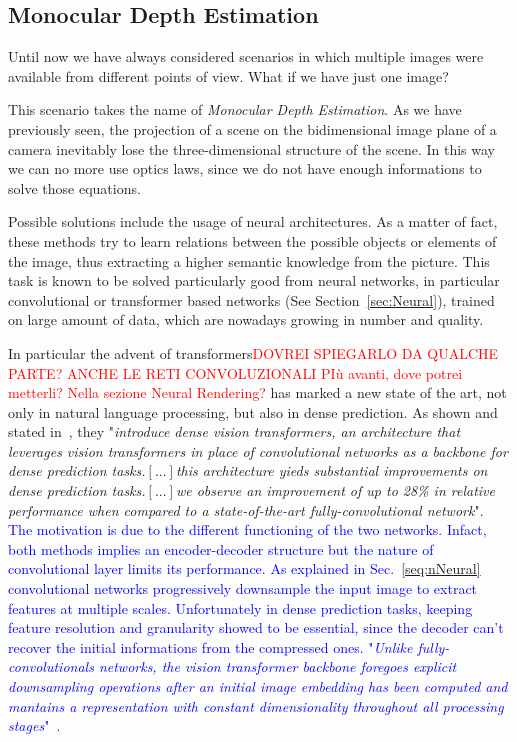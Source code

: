 \subsection{Monocular Depth Estimation}
Until now we have always considered scenarios in which multiple images were 
available from different points of view. What if we have just one image?

This scenario takes the name of \textit{Monocular Depth Estimation}. As we have previously seen,
the projection of a scene on the bidimensional image plane of a camera inevitably lose the three-dimensional
structure of the scene. In this way we can no more use optics laws, since we do not have enough informations to 
solve those equations.

Possible solutions include the usage of neural architectures. As a matter of fact, these methods try to learn relations
between the possible objects or elements of the image, thus extracting a higher semantic knowledge from the picture.
This task is known to be solved particularly good from neural networks, in particular convolutional or transformer based 
networks (See Section~\ref{sec:Neural}), trained on large amount of data, which are nowadays growing in number and quality.

In particular the advent of transformers\textcolor{red}{DOVREI SPIEGARLO DA QUALCHE PARTE? ANCHE 
LE RETI CONVOLUZIONALI PIù avanti, dove potrei metterli? Nella sezione Neural Rendering?} has marked a new state of the art, not only in natural language processing, but also in dense prediction.
As shown and stated in~\cite{Ranftl2021}, they "\textit{introduce dense vision transformers, an architecture that leverages vision transformers 
in place of convolutional networks as a backbone for dense prediction tasks.$[...]$this architecture yieds substantial improvements
on dense prediction tasks.$[...]$we observe an improvement of up to 28\% in relative performance when compared to a state-of-the-art 
fully-convolutional network}". \textcolor{blue}{The motivation is due to the different functioning of the two networks. Infact, both methods
implies an encoder-decoder structure but the nature of convolutional layer limits its performance. As explained in Sec.~\ref{seq:nNeural}
convolutional networks progressively downsample the input image to extract features at multiple scales. Unfortunately in 
dense prediction tasks, keeping feature resolution and granularity showed to be essential, since the decoder can't recover
the initial informations from the compressed ones. "\textit{Unlike fully-convolutionals networks, the vision transformer
backbone foregoes explicit downsampling operations after an initial image embedding has been computed
and mantains a representation with constant dimensionality throughout all processing stages}"~\cite{Ranftl2021}.
}

